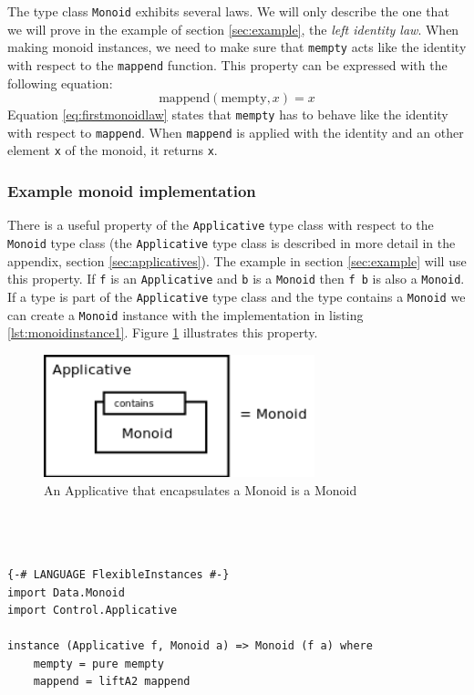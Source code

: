 The type class \verb|Monoid| exhibits several laws. We will only describe the one that we will prove in the example of section \ref{sec:example}, the \emph{left identity law}.
When making monoid instances, we need to make sure that \verb|mempty| acts like the identity with respect to the \verb|mappend| function. This property can be expressed with the following equation:
\begin{equation}
  \label{eq:firstmonoidlaw}
  \text{mappend}(\text{mempty}, x) = x
\end{equation}
Equation \ref{eq:firstmonoidlaw} states that \verb|mempty| has to behave like the identity with respect to \verb|mappend|. When \verb|mappend| is applied with the identity and an other element \verb|x| of the monoid, it returns \verb|x|.

\subsubsection{Example monoid implementation}

There is a useful property of the \verb|Applicative| type class with respect to the \verb|Monoid| type class (the \verb|Applicative| type class is described in more detail in the appendix, section \ref{sec:applicatives}). The example in section \ref{sec:example} will use this property. If \verb|f| is an \verb|Applicative| and \verb|b| is a \verb|Monoid| then \verb|f b| is also a \verb|Monoid|. If a type is part of the \verb|Applicative| type class and the type contains a \verb|Monoid| we can create a \verb|Monoid| instance with the implementation in listing \ref{lst:monoidinstance1}. Figure \ref{fig:applicative_monoid} illustrates this property.

\begin{figure}
  \centering
     \includegraphics[width=0.7\textwidth]{monoid}
  \caption{An {\ttfamily Applicative} that encapsulates a {\ttfamily Monoid} is a {\ttfamily Monoid}}
  \label{fig:applicative_monoid}
\end{figure}

\lstset{
basicstyle=\ttfamily,
columns=fullflexible,
keepspaces=true,
captionpos=b
}
\begin{lstlisting}[caption={{\ttfamily Monoid} instance implementation of {\ttfamily IO}},label={lst:monoidinstance1}]



{-# LANGUAGE FlexibleInstances #-} 
import Data.Monoid
import Control.Applicative 

instance (Applicative f, Monoid a) => Monoid (f a) where
    mempty = pure mempty
    mappend = liftA2 mappend
\end{lstlisting}

